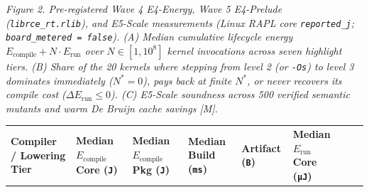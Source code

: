 \documentclass[10pt,letterpaper]{article}
\begin{document}
\emph{Figure 2. Pre-registered Wave 4 E4-Energy, Wave 5 E4-Prelude
(\texttt{librce\_\allowbreak{}rt.\allowbreak{}rlib}), and E5-Scale measurements (Linux RAPL core
\texttt{reported\_\allowbreak{}j}; \texttt{board\_\allowbreak{}metered\ =\ false}). (A) Median
cumulative lifecycle energy
\(E_{\text{compile}} + N \cdot E_{\text{run}}\) over \(N \in [1, 10^8]\)
kernel invocations across seven highlight tiers. (B) Share of the 20
kernels where stepping from level 2 (or \texttt{-Os}) to level 3
dominates immediately (\(N^* = 0\)), pays back at finite \(N^*\), or
never recovers its compile cost (\(\Delta E_{\text{run}} \le 0\)). (C)
E5-Scale soundness across 500 verified semantic mutants and warm De
Bruijn cache savings {[}M{]}.}

{\scriptsize\setlength{\tabcolsep}{2.4pt}\renewcommand{\arraystretch}{1.12}
\begin{longtable}[]{@{}
  >{\raggedright\arraybackslash}p{}
  >{\raggedleft\arraybackslash}p{}
  >{\raggedleft\arraybackslash}p{}
  >{\raggedleft\arraybackslash}p{}
  >{\raggedleft\arraybackslash}p{}
  >{\raggedleft\arraybackslash}p{}
  >{\raggedleft\arraybackslash}p{}
  >{\raggedleft\arraybackslash}p{}@{}}
\toprule\noalign{}
\begin{minipage}[b]{\linewidth}\raggedright
\textbf{Compiler / Lowering Tier}
\end{minipage} & \begin{minipage}[b]{\linewidth}\raggedleft
\textbf{Median \(E_{\text{compile}}\) Core (\texttt{J})}
\end{minipage} & \begin{minipage}[b]{\linewidth}\raggedleft
\textbf{Median \(E_{\text{compile}}\) Pkg (\texttt{J})}
\end{minipage} & \begin{minipage}[b]{\linewidth}\raggedleft
\textbf{Median Build (\texttt{ms})}
\end{minipage} & \begin{minipage}[b]{\linewidth}\raggedleft
\textbf{Artifact (\texttt{B})}
\end{minipage} & \begin{minipage}[b]{\linewidth}\raggedleft
\textbf{Median \(E_{\text{run}}\) Core (\texttt{µJ})}

\end{minipage}
\end{longtable}}
\end{document}
